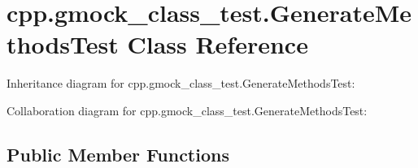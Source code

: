 \hypertarget{classcpp_1_1gmock__class__test_1_1_generate_methods_test}{}\section{cpp.\+gmock\+\_\+class\+\_\+test.\+Generate\+Methods\+Test Class Reference}
\label{classcpp_1_1gmock__class__test_1_1_generate_methods_test}


Inheritance diagram for cpp.\+gmock\+\_\+class\+\_\+test.\+Generate\+Methods\+Test\+:


Collaboration diagram for cpp.\+gmock\+\_\+class\+\_\+test.\+Generate\+Methods\+Test\+:
\subsection*{Public Member Functions}
